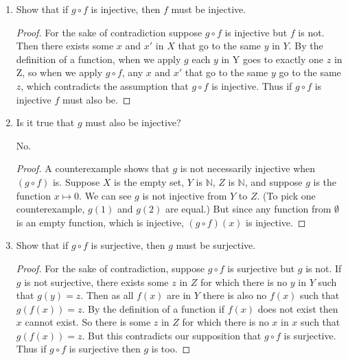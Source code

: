 \documentclass[../../main.tex]{subfiles}
\begin{document}
\begin{enumerate}
    \item
    \begin{q}
        Show that if $g \circ f$ is injective, then $f$ must be injective.
    \end{q}

    \begin{proof}
        For the sake of contradiction suppose $g \circ f$ is injective but $f$ is not.
        Then there exists some $x$ and $x'$ in $X$ that go to the same $y$ in $Y$.
        By the definition of a function, when we apply $g$ each $y$ in Y goes to exactly one $z$ in Z, so when we apply $g \circ f$, any $x$ and $x'$ that go to the same $y$ go to the same $z$, which contradicts the assumption that $g \circ f$ is injective.
        Thus if $g \circ f$ is injective $f$ must also be.
    \end{proof}

    \item
    \begin{q}
        Is it true that $g$ must also be injective?
    \end{q}

   \begin{ans}
     No.
   \end{ans}

    \begin{proof}
        A counterexample shows that $g$ is not necessarily injective when $(g \circ f)$ is.
        Suppose $X$ is the empty set, $Y$ is $\mathbb{N}$, $Z$ is $\mathbb{N}$, and suppose $g$ is the function $x \mapsto 0$.
        We can see $g$ is not injective from $Y$ to $Z$. (To pick one counterexample, $g(1)$ and $g(2)$ are equal.)
        But since any function from $\emptyset$ is an empty function, which is injective, $(g \circ f)(x)$ is injective.
    \end{proof}

    \item
    \begin{q}
        Show that if $g \circ f$ is surjective, then $g$ must be surjective.
    \end{q}

    \begin{proof}
        For the sake of contradiction, suppose $g \circ f$ is surjective but $g$ is not.
        If $g$ is not surjective, there exists some $z$ in $Z$ for which there is no $y$ in $Y$ such that $g(y)=z$.
        Then as all $f(x)$ are in $Y$ there is also no $f(x)$ such that $g(f(x))=z$.
        By the definition of a function if $f(x)$ does not exist then $x$ cannot exist.
        So there is some $z$ in $Z$ for which there is no $x$ in $x$ such that $g(f(x))=z$.
        But this contradicts our supposition that $g \circ f$ is surjective.
        Thus if $g \circ f$ is surjective then $g$ is too.
    \end{proof}


\end{enumerate}
\end{document}
